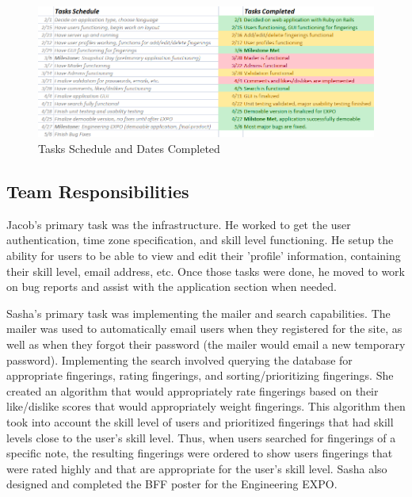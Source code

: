 \documentclass[12pt,english]{article}
\begin{document}
\begin{figure}[H]


\caption{Tasks Schedule and Dates Completed}


\begin{centering}
\includegraphics[scale=0.5]{schedule}
\par\end{centering}

\end{figure}



\subsection{Team Responsibilities}

Jacob's primary task was the infrastructure. He worked to get the
user authentication, time zone specification, and skill level functioning.
He setup the ability for users to be able to view and edit their 'profile'
information, containing their skill level, email address, etc. Once
those tasks were done, he moved to work on bug reports and assist
with the application section when needed.

Sasha's primary task was implementing the mailer and search capabilities.
The mailer was used to automatically email users when they registered
for the site, as well as when they forgot their password (the mailer
would email a new temporary password). Implementing the search involved
querying the database for appropriate fingerings, rating fingerings,
and sorting/prioritizing fingerings. She created an algorithm that
would appropriately rate fingerings based on their like/dislike scores
that would appropriately weight fingerings. This algorithm then took
into account the skill level of users and prioritized fingerings that
had skill levels close to the user's skill level. Thus, when users
searched for fingerings of a specific note, the resulting fingerings
were ordered to show users fingerings that were rated highly and that
are appropriate for the user's skill level. Sasha also designed and
completed the BFF poster for the Engineering EXPO. 
\end{document}
